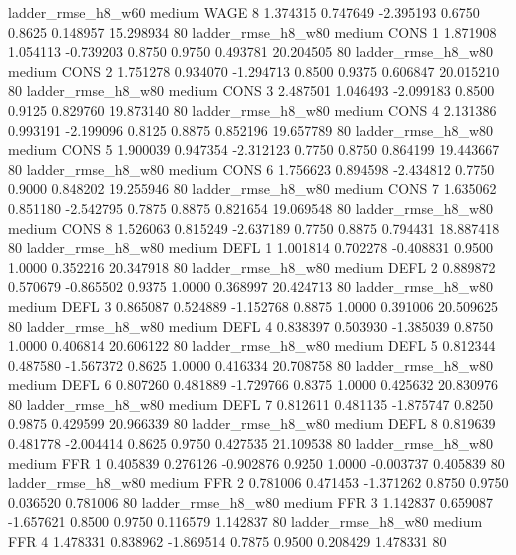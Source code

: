    ladder_rmse_h8_w60     medium     WAGE                 8  1.374315 0.747649 -2.395193 0.6750 0.8625  0.148957   15.298934 80
    ladder_rmse_h8_w80     medium     CONS                 1  1.871908 1.054113 -0.739203 0.8750 0.9750  0.493781   20.204505 80
    ladder_rmse_h8_w80     medium     CONS                 2  1.751278 0.934070 -1.294713 0.8500 0.9375  0.606847   20.015210 80
    ladder_rmse_h8_w80     medium     CONS                 3  2.487501 1.046493 -2.099183 0.8500 0.9125  0.829760   19.873140 80
    ladder_rmse_h8_w80     medium     CONS                 4  2.131386 0.993191 -2.199096 0.8125 0.8875  0.852196   19.657789 80
    ladder_rmse_h8_w80     medium     CONS                 5  1.900039 0.947354 -2.312123 0.7750 0.8750  0.864199   19.443667 80
    ladder_rmse_h8_w80     medium     CONS                 6  1.756623 0.894598 -2.434812 0.7750 0.9000  0.848202   19.255946 80
    ladder_rmse_h8_w80     medium     CONS                 7  1.635062 0.851180 -2.542795 0.7875 0.8875  0.821654   19.069548 80
    ladder_rmse_h8_w80     medium     CONS                 8  1.526063 0.815249 -2.637189 0.7750 0.8875  0.794431   18.887418 80
    ladder_rmse_h8_w80     medium     DEFL                 1  1.001814 0.702278 -0.408831 0.9500 1.0000  0.352216   20.347918 80
    ladder_rmse_h8_w80     medium     DEFL                 2  0.889872 0.570679 -0.865502 0.9375 1.0000  0.368997   20.424713 80
    ladder_rmse_h8_w80     medium     DEFL                 3  0.865087 0.524889 -1.152768 0.8875 1.0000  0.391006   20.509625 80
    ladder_rmse_h8_w80     medium     DEFL                 4  0.838397 0.503930 -1.385039 0.8750 1.0000  0.406814   20.606122 80
    ladder_rmse_h8_w80     medium     DEFL                 5  0.812344 0.487580 -1.567372 0.8625 1.0000  0.416334   20.708758 80
    ladder_rmse_h8_w80     medium     DEFL                 6  0.807260 0.481889 -1.729766 0.8375 1.0000  0.425632   20.830976 80
    ladder_rmse_h8_w80     medium     DEFL                 7  0.812611 0.481135 -1.875747 0.8250 0.9875  0.429599   20.966339 80
    ladder_rmse_h8_w80     medium     DEFL                 8  0.819639 0.481778 -2.004414 0.8625 0.9750  0.427535   21.109538 80
    ladder_rmse_h8_w80     medium      FFR                 1  0.405839 0.276126 -0.902876 0.9250 1.0000 -0.003737    0.405839 80
    ladder_rmse_h8_w80     medium      FFR                 2  0.781006 0.471453 -1.371262 0.8750 0.9750  0.036520    0.781006 80
    ladder_rmse_h8_w80     medium      FFR                 3  1.142837 0.659087 -1.657621 0.8500 0.9750  0.116579    1.142837 80
    ladder_rmse_h8_w80     medium      FFR                 4  1.478331 0.838962 -1.869514 0.7875 0.9500  0.208429    1.478331 80
